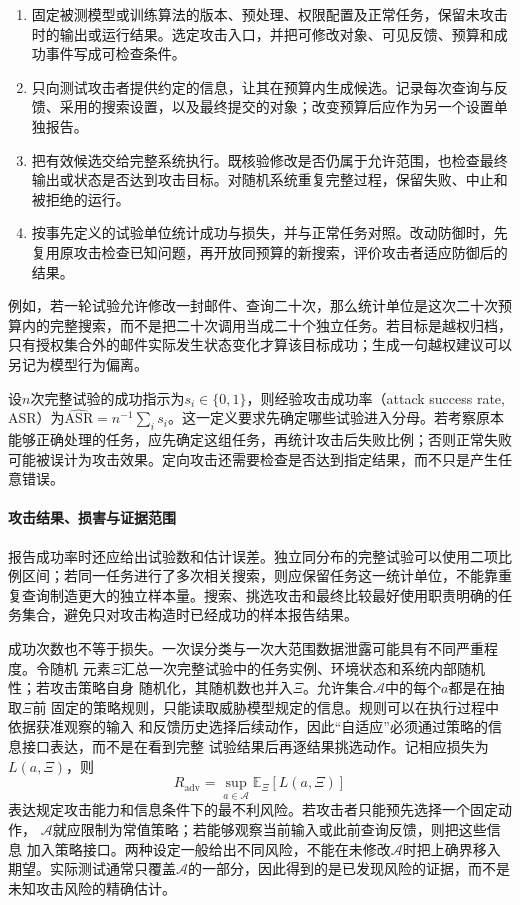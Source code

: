 \begin{enumerate}
 \item 固定被测模型或训练算法的版本、预处理、权限配置及正常任务，保留未攻击时的输出或运行结果。选定攻击入口，并把可修改对象、可见反馈、预算和成功事件写成可检查条件。
 \item 只向测试攻击者提供约定的信息，让其在预算内生成候选。记录每次查询与反馈、采用的搜索设置，以及最终提交的对象；改变预算后应作为另一个设置单独报告。
 \item 把有效候选交给完整系统执行。既核验修改是否仍属于允许范围，也检查最终输出或状态是否达到攻击目标。对随机系统重复完整过程，保留失败、中止和被拒绝的运行。
 \item 按事先定义的试验单位统计成功与损失，并与正常任务对照。改动防御时，先复用原攻击检查已知问题，再开放同预算的新搜索，评价攻击者适应防御后的结果。
\end{enumerate}

例如，若一轮试验允许修改一封邮件、查询二十次，那么统计单位是这次二十次预算内的完整搜索，而不是把二十次调用当成二十个独立任务。若目标是越权归档，只有授权集合外的邮件实际发生状态变化才算该目标成功；生成一句越权建议可以另记为模型行为偏离。

设$n$次完整试验的成功指示为$s_i\in\{0,1\}$，则经验攻击成功率（attack success rate, ASR）为$\widehat{\mathrm{ASR}}=n^{-1}\sum_i s_i$。这一定义要求先确定哪些试验进入分母。若考察原本能够正确处理的任务，应先确定这组任务，再统计攻击后失败比例；否则正常失败可能被误计为攻击效果。定向攻击还需要检查是否达到指定结果，而不只是产生任意错误。

\paragraph{攻击结果、损害与证据范围}

报告成功率时还应给出试验数和估计误差。独立同分布的完整试验可以使用二项比例区间；若同一任务进行了多次相关搜索，则应保留任务这一统计单位，不能靠重复查询制造更大的独立样本量。搜索、挑选攻击和最终比较最好使用职责明确的任务集合，避免只对攻击构造时已经成功的样本报告结果。

成功次数也不等于损失。一次误分类与一次大范围数据泄露可能具有不同严重程度。令随机
元素$\Xi$汇总一次完整试验中的任务实例、环境状态和系统内部随机性；若攻击策略自身
随机化，其随机数也并入$\Xi$。允许集合$\mathcal A$中的每个$a$都是在抽取$\Xi$前
固定的策略规则，只能读取威胁模型规定的信息。规则可以在执行过程中依据获准观察的输入
和反馈历史选择后续动作，因此“自适应”必须通过策略的信息接口表达，而不是在看到完整
试验结果后再逐结果挑选动作。记相应损失为$L(a,\Xi)$，则
\begin{equation}
 R_{\mathrm{adv}}=\sup_{a\in\mathcal A}
 \mathbb E_{\Xi}[L(a,\Xi)]
 \label{eq:security-adversarial-risk}
\end{equation}
表达规定攻击能力和信息条件下的最不利风险。若攻击者只能预先选择一个固定动作，
$\mathcal A$就应限制为常值策略；若能够观察当前输入或此前查询反馈，则把这些信息
加入策略接口。两种设定一般给出不同风险，不能在未修改$\mathcal A$时把上确界移入
期望。实际测试通常只覆盖$\mathcal A$的一部分，因此得到的是已发现风险的证据，而不是未知攻击风险的精确估计。

